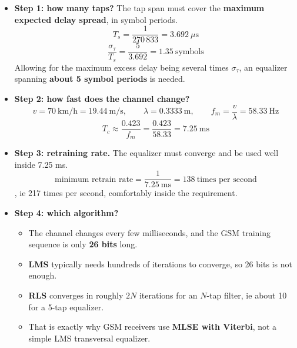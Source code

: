 \begin{itemize}
  \item \textbf{Step 1: how many taps?} The tap span must cover the \textbf{maximum expected delay
        spread}, in symbol periods.
        \[ T_s = \frac{1}{270\,833} = 3.692\ \mu\text{s} \]
        \[ \frac{\sigma_\tau}{T_s} = \frac{5}{3.692} = 1.35\ \text{symbols} \]
        Allowing for the maximum excess delay being several times $\sigma_\tau$, an equalizer
        spanning \textbf{about 5 symbol periods} is needed. 
  \item \textbf{Step 2: how fast does the channel change?}
        \[ v = 70\ \text{km/h} = 19.44\ \text{m/s}, \qquad
           \lambda = 0.3333\ \text{m}, \qquad f_m = \frac{v}{\lambda} = 58.33\ \text{Hz} \]
        \[ T_c \approx \frac{0.423}{f_m} = \frac{0.423}{58.33} = 7.25\ \text{ms} \]
  \item \textbf{Step 3: retraining rate.} The equalizer must converge and be used well inside
        7.25 ms.
        \[ \text{minimum retrain rate} = \frac{1}{7.25\ \text{ms}} = 138\ \text{times per second} \]
        , ie 217 times per second,
        comfortably inside the requirement. \checkmark
  \item \textbf{Step 4: which algorithm?}
  \begin{itemize}
    \item The channel changes every few milliseconds, and the GSM training sequence is only
          \textbf{26 bits} long.
    \item \textbf{LMS} typically needs hundreds of iterations to converge, so 26 bits is not
          enough.
    \item \textbf{RLS} converges in roughly $2N$ iterations for an $N$-tap filter, ie about 10
          for a 5-tap equalizer. 
    \item That is exactly why GSM receivers use \textbf{MLSE with Viterbi}, not a simple LMS
          transversal equalizer.
  \end{itemize}
\end{itemize}

\hr

{\color{sub}\footnotesize {}}


